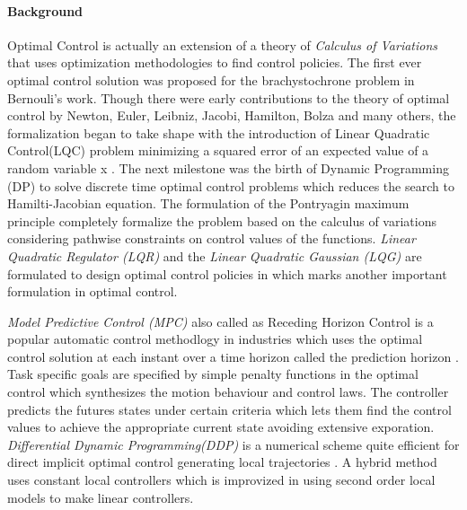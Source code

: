 \paragraph{Background}
Optimal Control is actually an extension of a theory of \textit{Calculus of Variations} that uses optimization methodologies to find control policies. The first ever optimal control solution was proposed for the brachystochrone problem in Bernouli's work. Though there were early contributions to the theory of optimal control by Newton, Euler, Leibniz, Jacobi, Hamilton, Bolza and many others, the formalization began to take shape with the introduction of Linear Quadratic Control(LQC) problem minimizing a squared error of an expected value of a random variable x \cite{wiener1949extrapolation}. The next milestone was the birth of Dynamic Programming (DP) to solve discrete time optimal control problems which reduces the search to Hamilti-Jacobian equation. The formulation of the Pontryagin maximum principle \cite{pontryagin1987mathematical} completely formalize the problem based on the calculus of variations considering  pathwise constraints on control values of the functions. \textit{Linear Quadratic Regulator (LQR)} and the \textit{Linear Quadratic Gaussian (LQG)} are formulated to design optimal control policies in \cite{Kalman1960} which marks another important formulation in optimal control.

\textit{Model Predictive Control (MPC)} also called as Receding Horizon Control is a popular automatic control methodlogy in industries which uses the optimal control solution at each instant over a time horizon called the prediction horizon \cite{richalet1978model}. Task specific goals are specified by simple penalty functions in the optimal control which synthesizes the motion behaviour and control laws. The controller predicts the futures states under certain criteria which lets them find the control values to achieve the appropriate current state avoiding extensive exporation. \textit{Differential Dynamic Programming(DDP)} is a numerical scheme quite efficient for direct implicit optimal control generating local trajectories \cite{jacobson1968new}. A hybrid method uses constant local controllers \cite{atkeson1994using} which is improvized in \cite{atkeson2003nonparametric} using second order local models to make linear controllers.


